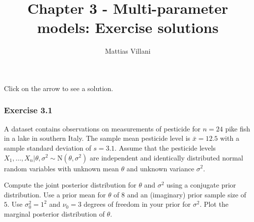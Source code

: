 \documentclass[
  letterpaper,
  DIV=11,
  numbers=noendperiod]{scrartcl}
\title{Chapter 3 - Multi-parameter models: Exercise solutions}
\author{Mattias Villani}
\date{}
\begin{document}
\maketitle


Click on the arrow to see a solution.

\subsubsection{Exercise 3.1}\label{exercise-3.1}

A dataset contains observations on measurements of pesticide for
\(n=24\) pike fish in a lake in southern Italy. The sample mean
pesticide level is \(\bar{x} = 12.5\) with a sample standard deviation
of \(s=3.1\). Assume that the pesticide levels
\(X_1,\ldots,X_n|\theta,\sigma^2 \sim \mathrm{N}(\theta,\sigma^2)\) are
independent and identically distributed normal random variables with
unknown mean \(\theta\) and unknown variance \(\sigma^2\).

Compute the joint posterior distribution for \(\theta\) and \(\sigma^2\)
using a conjugate prior distribution. Use a prior mean for \(\theta\) of
\(8\) and an (imaginary) prior sample size of \(5\). Use
\(\sigma_0^2 = 1^2\) and \(\nu_0 = 3\) degrees of freedom in your prior
for \(\sigma^2\). Plot the marginal posterior distribution of
\(\theta\).
\end{document}
